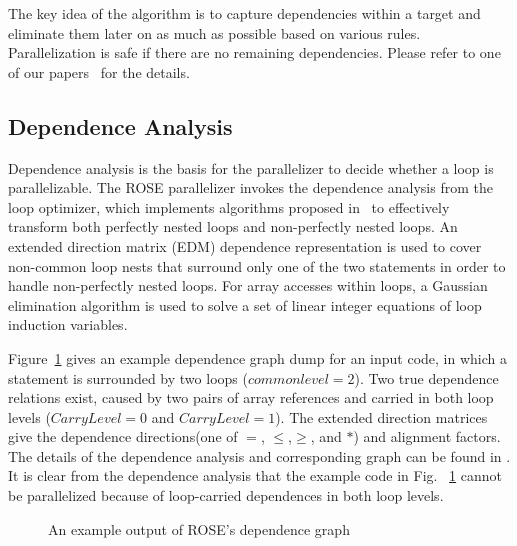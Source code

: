 The key idea of the algorithm is to capture dependencies within a target and eliminate them later on as much as possible based on
various rules.
Parallelization is safe if there are no remaining dependencies.
Please refer to one of our papers~\cite{LiaoExtending2009} for the details. 
\subsection{Dependence Analysis}
Dependence analysis is the basis for the parallelizer to decide whether a loop is
parallelizable.
The ROSE parallelizer invokes the dependence analysis from the loop optimizer, which implements algorithms proposed in~%
\cite{YAK:PLDI00,YK:LACSI02} to effectively transform
both perfectly nested loops and non-perfectly nested loops.
An extended direction matrix
(EDM) dependence representation is used to cover non-common loop nests that surround
only one of the two statements in order to handle non-perfectly
nested loops. For array accesses within loops, a Gaussian elimination
algorithm is used to solve a set of linear integer equations of loop induction
variables. 

Figure~\ref{code.depGraph} gives an example dependence graph dump for an input
code, in which a statement is surrounded by two loops
($\mathit{commonlevel} = 2$). 
Two true dependence relations exist, caused by two pairs of array
references and carried in both loop levels ($\mathit{CarryLevel} = 0$ and
$\mathit{CarryLevel} = 1$).  
The extended direction matrices give the
dependence directions(one of $=$, $\leq$,$\geq$, and $*$) and alignment factors.
The details of the dependence analysis and corresponding graph
can be found in \cite{YAK:PLDI00,YK:LACSI02}.
It is clear from the dependence analysis that the example code in Fig.~%
\ref{code.depGraph} cannot be parallelized because of 
loop-carried dependences in both loop levels.

\begin{figure}[!ht]
 \centering
        
  \caption{\label{code.depGraph} An example output of ROSE's dependence graph}
\end{figure}


